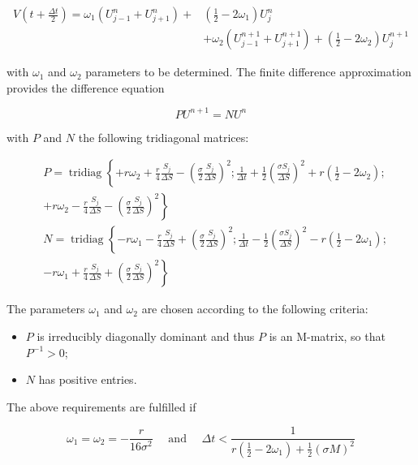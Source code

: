 \documentclass[10pt]{article}
\begin{document}
\begin{align*}
V\left(t+\frac{\Delta t}{2}\right)=\omega_{1}\left(U_{j-1}^{n}+U_{j+1}^{n}\right)+ & \left(\frac{1}{2}-2 \omega_{1}\right) U_{j}^{n}  \tag{8}\\
& +\omega_{2}\left(U_{j-1}^{n+1}+U_{j+1}^{n+1}\right)+\left(\frac{1}{2}-2 \omega_{2}\right) U_{j}^{n+1}
\end{align*}


with $\omega_{1}$ and $\omega_{2}$ parameters to be determined. The finite difference approximation provides the difference equation

$$
P U^{n+1}=N U^{n}
$$

with $P$ and $N$ the following tridiagonal matrices:

$$
\begin{aligned}
& P=\operatorname{tridiag}\left\{+r \omega_{2}+\frac{r}{4} \frac{S_{j}}{\Delta S}-\left(\frac{\sigma}{2} \frac{S_{j}}{\Delta S}\right)^{2} ; \frac{1}{\Delta t}+\frac{1}{2}\left(\frac{\sigma S_{j}}{\Delta S}\right)^{2}+r\left(\frac{1}{2}-2 \omega_{2}\right) ;\right. \\
& \left.+r \omega_{2}-\frac{r}{4} \frac{S_{j}}{\Delta S}-\left(\frac{\sigma}{2} \frac{S_{j}}{\Delta S}\right)^{2}\right\} \\
& N=\operatorname{tridiag}\left\{-r \omega_{1}-\frac{r}{4} \frac{S_{j}}{\Delta S}+\left(\frac{\sigma}{2} \frac{S_{j}}{\Delta S}\right)^{2} ; \frac{1}{\Delta t}-\frac{1}{2}\left(\frac{\sigma S_{j}}{\Delta S}\right)^{2}-r\left(\frac{1}{2}-2 \omega_{1}\right) ;\right. \\
& \left.-r \omega_{1}+\frac{r}{4} \frac{S_{j}}{\Delta S}+\left(\frac{\sigma}{2} \frac{S_{j}}{\Delta S}\right)^{2}\right\}
\end{aligned}
$$

The parameters $\omega_{1}$ and $\omega_{2}$ are chosen according to the following criteria:

\begin{itemize}
  \item $P$ is irreducibly diagonally dominant and thus $P$ is an M-matrix, so that $P^{-1}>0$;
  \item $N$ has positive entries.
\end{itemize}

The above requirements are fulfilled if


\begin{equation*}
\omega_{1}=\omega_{2}=-\frac{r}{16 \sigma^{2}} \quad \text { and } \quad \Delta t<\frac{1}{r\left(\frac{1}{2}-2 \omega_{1}\right)+\frac{1}{2}(\sigma M)^{2}} \tag{9}
\end{equation*}
\end{document}

